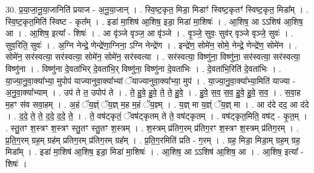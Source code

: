 \documentclass[17pt]{extarticle}
\begin{document}
30. प्र॒या॒जा॒नू॒या॒जानिति॑ प्रयाज - अ॒नू॒या॒जान् । . स्वि॒ष्ट॒कृत॒ मिडा॒ मिडाꣳ॑ स्विष्ट॒कृतꣳ॑ स्विष्ट॒कृत॒ मिडा᳚म् । . स्वि॒ष्ट॒कृत॒मिति॑ स्विष्ट - कृत᳚म् । . इडा॑ मा॒शिष॑ आ॒शिष॒ इडा॒ मिडा॑ मा॒शिषः॑ । . आ॒शिष॒ आ ऽऽशिष॑ आ॒शिष॒ आ । . आ॒शिष॒ इत्या᳚ - शिषः॑ । . आ वृ॑ञ्जे वृञ्ज॒ आ वृ॑ञ्जे । . वृ॒ञ्जे॒ सुवः॒ सुव॑र् वृञ्जे वृञ्जे॒ सुवः॑ । . सुव॒रिति॒ सुवः॑ । . अ॒ग्नि नेन्द्रे॒ णेन्द्रे॑णा॒ग्निना॒ ऽग्नि नेन्द्रे॑ण । . इन्द्रे॑ण॒ सोमे॑न॒ सोमे॒ नेन्द्रे॒ णेन्द्रे॑ण॒ सोमे॑न । . सोमे॑न॒ सर॑स्वत्या॒ सर॑स्वत्या॒ सोमे॑न॒ सोमे॑न॒ सर॑स्वत्या । . सर॑स्वत्या॒ विष्णु॑ना॒ विष्णु॑ना॒ सर॑स्वत्या॒ सर॑स्वत्या॒ विष्णु॑ना । . विष्णु॑ना दे॒वता॑भिर् दे॒वता॑भि॒र् विष्णु॑ना॒ विष्णु॑ना दे॒वता॑भिः । . दे॒वता॑भि॒रिति॑ दे॒वता॑भिः । . या॒ज्या॒नु॒वा॒क्या᳚भ्या॒ मुपोप॑ याज्यानुवा॒क्या᳚भ्यां ॅयाज्यानुवा॒क्या᳚भ्या॒ मुप॑ । . या॒ज्या॒नु॒वा॒क्या᳚भ्या॒मिति॑ याज्या - अ॒नु॒वा॒क्या᳚भ्याम् । . उप॑ ते त॒ उपोप॑ ते । . ते॒ हु॒वे॒ हु॒वे॒ ते॒ ते॒ हु॒वे॒ । . हु॒वे॒ स॒व॒ स॒व॒ हु॒वे॒ हु॒वे॒ स॒व॒ । . स॒वा॒ह म॒हꣳ स॑व सवा॒हम् । . अ॒हं ॅय॒ज्ञ्ं ॅय॒ज्ञ् म॒ह म॒हं ॅय॒ज्ञ्म् । . य॒ज्ञ् मा य॒ज्ञ्ं ॅय॒ज्ञ् मा । . आ द॑दे दद॒ आ द॑दे । . द॒दे॒ ते॒ ते॒ द॒दे॒ द॒दे॒ ते॒ । . ते॒ वष॑ट्कृतं॒ ॅवष॑ट्कृतम् ते ते॒ वष॑ट्कृतम् । . वष॑ट्कृत॒मिति॒ वष॑ट् - कृ॒त॒म् । . स्तु॒तꣳ श॒स्त्रꣳ श॒स्त्रꣳ स्तु॒तꣳ स्तु॒तꣳ श॒स्त्रम् । . श॒स्त्रम् प्र॑तिग॒रम् प्र॑तिग॒रꣳ श॒स्त्रꣳ श॒स्त्रम् प्र॑तिग॒रम् । . प्र॒ति॒ग॒रम् ग्रह॒म् ग्रह॑म् प्रतिग॒रम् प्र॑तिग॒रम् ग्रह᳚म् । . प्र॒ति॒ग॒रमिति॑ प्रति - ग॒रम् । . ग्रह॒ मिडा॒ मिडा॒म् ग्रह॒म् ग्रह॒ मिडा᳚म् । . इडा॑ मा॒शिष॑ आ॒शिष॒ इडा॒ मिडा॑ मा॒शिषः॑ । . आ॒शिष॒ आ ऽऽशिष॑ आ॒शिष॒ आ । . आ॒शिष॒ इत्या᳚ - शिषः॑ । \newline
\end{document}
